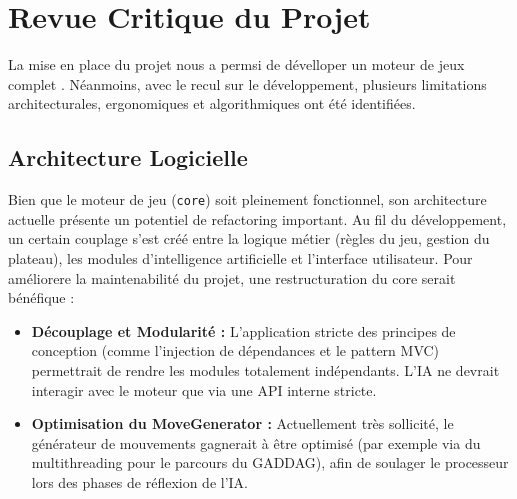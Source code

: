 \documentclass[a4paper]{article}
\begin{document}

	
    \section{Revue Critique du Projet}
	
	La mise en place du projet nous a permsi de dévelloper un moteur de jeux complet . Néanmoins, avec le recul  sur le développement, plusieurs limitations architecturales, ergonomiques et algorithmiques ont été identifiées. 
	\subsection{Architecture Logicielle}
	Bien que le moteur de jeu (\texttt{core}) soit pleinement fonctionnel, son architecture actuelle présente un potentiel de refactoring important. Au fil du développement, un certain couplage s'est créé entre la logique métier (règles du jeu, gestion du plateau), les modules d'intelligence artificielle et l'interface utilisateur.
	Pour améliorere la maintenabilité du projet, une restructuration du core serait bénéfique :
	\begin{itemize}
		\item \textbf{Découplage et Modularité :} L'application stricte des principes de conception (comme l'injection de dépendances et le pattern MVC) permettrait de rendre les modules totalement indépendants. L'IA ne devrait interagir avec le moteur que via une API interne stricte.
		\item \textbf{Optimisation du MoveGenerator :} Actuellement très sollicité, le générateur de mouvements gagnerait à être optimisé (par exemple via du multithreading pour le parcours du GADDAG), afin de soulager le processeur lors des phases de réflexion de l'IA.
	\end{itemize}
	
\end{document}
